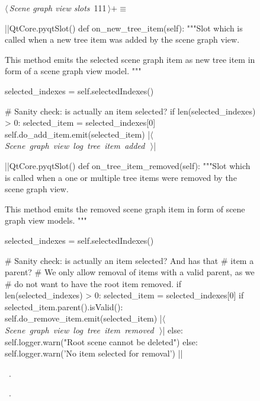 \documentclass[%
    a4paper,    %
    justified,  %
    nobib,      %
    openany     %
]{tufte-book}
\makeatletter
\renewcommand{\label}[1]{\@tufte@label{##1}}%
\makeatother
\begin{document}
\begin{figure}[!htbp]
\begin{flushleft} \small
\begin{minipage}{\linewidth}\label{scrap48}\raggedright\small
{} $\langle\,${\itshape Scene graph view slots}\nobreak\ {\footnotesize {111}}$\,\rangle+\equiv$
\vspace{-1ex}
\begin{pythoncode}
|\normalfont{}\fontfamily{}|QtCore.pyqtSlot()
def on_new_tree_item(self):
    """Slot which is called when a new tree item was added by the
    scene graph view.

    This method emits the selected scene graph item as new tree
    item in form of a scene graph view model.
    """

    selected_indexes = self.selectedIndexes()

    # Sanity check: is actually an item selected?
    if len(selected_indexes) > 0:
        selected_item = selected_indexes[0]
        self.do_add_item.emit(selected_item)
        |\hbox{$\langle\,${\itshape Scene graph view log tree item added}\nobreak\ {\footnotesize {}}$\,\rangle$}|

|\normalfont{}\fontfamily{}|QtCore.pyqtSlot()
def on_tree_item_removed(self):
    """Slot which is called when a one or multiple tree items
    were removed by the scene graph view.

    This method emits the removed scene graph item in form of
    scene graph view models.
    """

    selected_indexes = self.selectedIndexes()

    # Sanity check: is actually an item selected? And has that
    # item a parent?
    # We only allow removal of items with a valid parent, as we
    # do not want to have the root item removed.
    if len(selected_indexes) > 0:
        selected_item = selected_indexes[0]
        if selected_item.parent().isValid():
            self.do_remove_item.emit(selected_item)
            |\hbox{$\langle\,${\itshape Scene graph view log tree item removed}\nobreak\ {\footnotesize {}}$\,\rangle$}|
        else:
            self.logger.warn("Root scene cannot be deleted")
    else:
        self.logger.warn('No item selected for removal')
|\NWsep|
\end{pythoncode}
\vspace{1.5ex}
\footnotesize
\begin{list}{}{\setlength{\itemsep}{-\parsep}\setlength{\itemindent}{-\leftmargin}}
\item \NWtxtMacroDefBy\ .
\item \NWtxtMacroRefIn\ .


\end{list}
\end{minipage}
\end{flushleft}
\end{figure}
\end{document}
